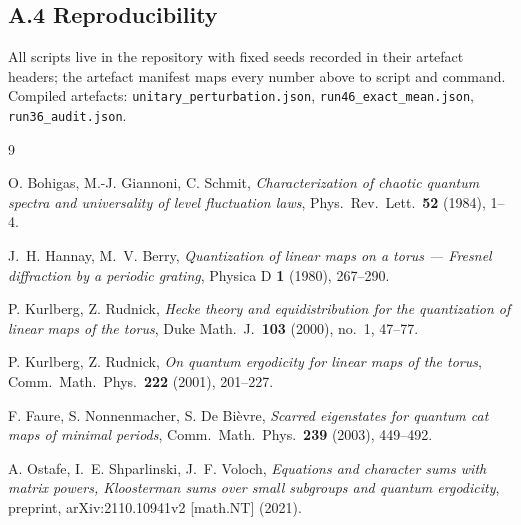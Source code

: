 \documentclass[11pt]{article}
\begin{document}
\subsection*{A.4 Reproducibility}
All scripts live in the repository with fixed seeds recorded in their
artefact headers; the artefact manifest maps every number above to
script and command. Compiled artefacts:
\texttt{unitary\_perturbation.json},
\texttt{run46\_exact\_mean.json}, \texttt{run36\_audit.json}.

\begin{thebibliography}{9}

O. Bohigas, M.-J. Giannoni, C. Schmit,
\emph{Characterization of chaotic quantum spectra and universality of
level fluctuation laws},
Phys.\ Rev.\ Lett.\ \textbf{52} (1984), 1--4.

J.~H. Hannay, M.~V. Berry,
\emph{Quantization of linear maps on a torus --- Fresnel diffraction
by a periodic grating},
Physica D \textbf{1} (1980), 267--290.

P. Kurlberg, Z. Rudnick,
\emph{Hecke theory and equidistribution for the quantization of linear
maps of the torus},
Duke Math.\ J.\ \textbf{103} (2000), no.~1, 47--77.

P. Kurlberg, Z. Rudnick,
\emph{On quantum ergodicity for linear maps of the torus},
Comm.\ Math.\ Phys.\ \textbf{222} (2001), 201--227.

F. Faure, S. Nonnenmacher, S. De Bi\`evre,
\emph{Scarred eigenstates for quantum cat maps of minimal periods},
Comm.\ Math.\ Phys.\ \textbf{239} (2003), 449--492.

A. Ostafe, I.~E. Shparlinski, J.~F. Voloch,
\emph{Equations and character sums with matrix powers, Kloosterman sums
over small subgroups and quantum ergodicity},
preprint, arXiv:2110.10941v2 [math.NT] (2021).

\end{thebibliography}
\end{document}
